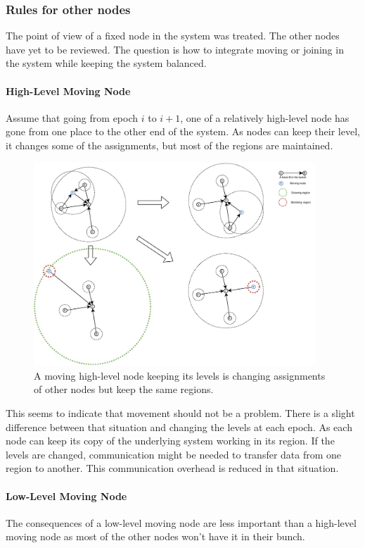 \documentclass[a4paper,11pt,twoside=semi,openright]{report}
\begin{document}
\subsubsection{Rules for other nodes} The point of view of a fixed node in the
system was treated. The other nodes have yet to be reviewed. The
question is how to integrate moving or joining in the system while keeping the
system balanced. 

\paragraph{High-Level Moving Node} Assume that going from epoch $i$ to $i+1$,
one of a relatively high-level node has gone from one place to the other end of
the system. As nodes can keep their level, it changes some of the assignments,
but most of the regions are maintained. 

\begin{figure}[!h] 
\centering
\includegraphics[width=300pt]{figures/LocarnoTreaties-Moving}
\caption{A moving high-level node keeping its levels is changing assignments of
    other nodes but keep the same regions. }
\label{fig:LocarnoTreaties-Moving}
\end{figure}

This seems to indicate that movement should not be a problem. There is a
slight difference between that situation and changing the levels at each
epoch. As each node can keep its copy of the underlying system working in its
region. If the levels are changed, communication might be needed to transfer
data from one region to another. This communication overhead is reduced in
that situation. 

\paragraph{Low-Level Moving Node}
The consequences of a low-level moving node are less important than a
high-level moving node as most of the other nodes won't have it in their bunch.
\end{document}
